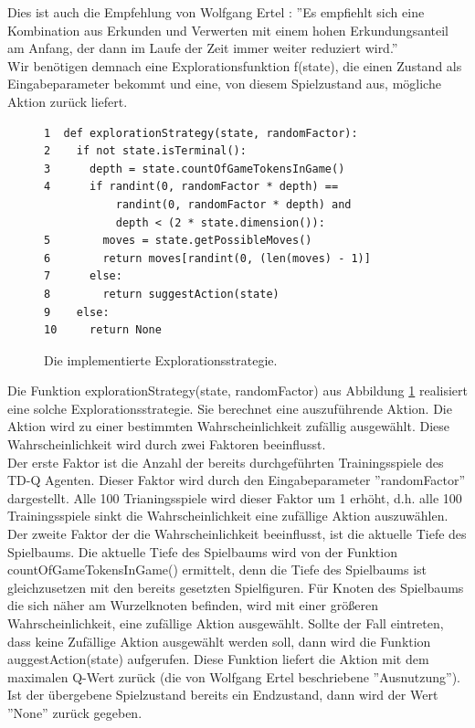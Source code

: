 Dies ist auch die Empfehlung von Wolfgang Ertel \cite[303]{Ertel}: ''Es empfiehlt sich eine Kombination aus Erkunden und Verwerten mit einem hohen Erkundungsanteil am Anfang, der dann im Laufe der Zeit immer weiter reduziert wird.'' \\

Wir benötigen demnach eine Explorationsfunktion f(state), die einen Zustand als Eingabeparameter bekommt und eine, von diesem Spielzustand aus, mögliche Aktion zurück liefert.\\

\begin{figure}[!htbp]
\centering
\begin{lstlisting}[frame=single, mathescape=true]
1  def explorationStrategy(state, randomFactor):
2    if not state.isTerminal():
3      depth = state.countOfGameTokensInGame()
4      if randint(0, randomFactor * depth) == 
           randint(0, randomFactor * depth) and
           depth < (2 * state.dimension()):
5        moves = state.getPossibleMoves()
6        return moves[randint(0, (len(moves) - 1)]
7      else:
8        return suggestAction(state)
9    else:
10     return None
\end{lstlisting}
\caption{Die implementierte Explorationsstrategie.}
\label{fig:Explorationsstrategie}
\end{figure} 

Die Funktion explorationStrategy(state, randomFactor) aus Abbildung \ref{fig:Explorationsstrategie} realisiert eine solche Explorationsstrategie. Sie berechnet eine auszuführende Aktion. Die Aktion wird zu einer bestimmten Wahrscheinlichkeit zufällig ausgewählt. Diese Wahrscheinlichkeit wird durch zwei Faktoren beeinflusst.\\

Der erste Faktor ist die Anzahl der bereits durchgeführten Trainingsspiele des TD-Q Agenten. Dieser Faktor wird durch den Eingabeparameter ''randomFactor'' dargestellt. Alle 100 Trianingsspiele wird dieser Faktor um 1 erhöht, d.h. alle 100 Trainingsspiele sinkt die Wahrscheinlichkeit eine zufällige  Aktion auszuwählen. \\

Der zweite Faktor der die Wahrscheinlichkeit beeinflusst, ist die aktuelle Tiefe des Spielbaums. Die aktuelle Tiefe des Spielbaums wird von der Funktion countOfGameTokensInGame() ermittelt, denn die Tiefe des Spielbaums ist gleichzusetzen mit den bereits gesetzten Spielfiguren. Für Knoten des Spielbaums die sich näher am Wurzelknoten befinden, wird mit einer größeren Wahrscheinlichkeit, eine zufällige Aktion ausgewählt. Sollte der Fall eintreten, dass keine Zufällige Aktion ausgewählt werden soll, dann wird die Funktion auggestAction(state) aufgerufen. Diese Funktion liefert die Aktion mit dem maximalen Q-Wert zurück (die von Wolfgang Ertel beschriebene ''Ausnutzung''). Ist der übergebene Spielzustand bereits ein Endzustand, dann wird der Wert ''None'' zurück gegeben.

